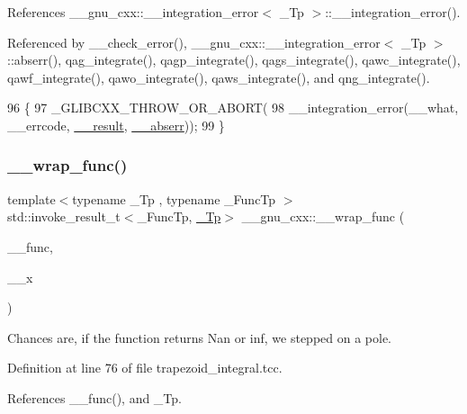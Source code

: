 References \+\_\+\+\_\+gnu\+\_\+cxx\+::\+\_\+\+\_\+integration\+\_\+error$<$ \+\_\+\+Tp $>$\+::\+\_\+\+\_\+integration\+\_\+error().



Referenced by \+\_\+\+\_\+check\+\_\+error(), \+\_\+\+\_\+gnu\+\_\+cxx\+::\+\_\+\+\_\+integration\+\_\+error$<$ \+\_\+\+Tp $>$\+::abserr(), qag\+\_\+integrate(), qagp\+\_\+integrate(), qags\+\_\+integrate(), qawc\+\_\+integrate(), qawf\+\_\+integrate(), qawo\+\_\+integrate(), qaws\+\_\+integrate(), and qng\+\_\+integrate().


\begin{DoxyCode}
96     \{
97       \_GLIBCXX\_THROW\_OR\_ABORT(
98         \_\_integration\_error(\_\_what, \_\_errcode, \hyperlink{namespace____gnu__cxx_a500ea9f53aeaecd8c2ae657503450578}{\_\_result}, \hyperlink{namespace____gnu__cxx_a72f736cff127f1574e91a301de9e074b}{\_\_abserr}));
99     \}
\end{DoxyCode}
\mbox{\label{namespace____gnu__cxx_aab02d54d27832cdb3d10d6262e03278e}} 
\subsubsection{\texorpdfstring{\+\_\+\+\_\+wrap\+\_\+func()}{\_\_wrap\_func()}}
{\footnotesize\ttfamily template$<$typename \+\_\+\+Tp , typename \+\_\+\+Func\+Tp $>$ \\
std\+::invoke\+\_\+result\+\_\+t$<$\+\_\+\+Func\+Tp, \hyperlink{namespace____gnu__cxx_a3b19a9c800ca194374ef9172290f7d79}{\+\_\+\+Tp}$>$ \+\_\+\+\_\+gnu\+\_\+cxx\+::\+\_\+\+\_\+wrap\+\_\+func (\begin{DoxyParamCaption}\item[{\+\_\+\+Func\+Tp}]{\+\_\+\+\_\+func,  }\item[{\hyperlink{namespace____gnu__cxx_a3b19a9c800ca194374ef9172290f7d79}{\+\_\+\+Tp}}]{\+\_\+\+\_\+x }\end{DoxyParamCaption})}

Chances are, if the function returns Nan or inf, we stepped on a pole. 

Definition at line 76 of file trapezoid\+\_\+integral.\+tcc.



References \+\_\+\+\_\+func(), and \+\_\+\+Tp.


